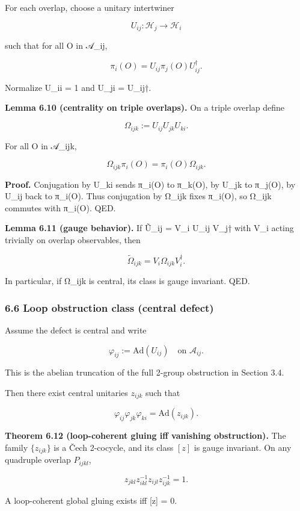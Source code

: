 \documentclass[
]{article}
\begin{document}
For each overlap, choose a unitary intertwiner

\[
U_{ij}: \mathcal H_j \to \mathcal H_i
\]

such that for all O in 𝒜\_ij,

\[
\pi_i(O) = U_{ij} \pi_j(O) U_{ij}^\dagger.
\]

Normalize U\_ii = 1 and U\_ji = U\_ij†.

\textbf{Lemma 6.10 (centrality on triple overlaps).} On a triple overlap
define

\[
\Omega_{ijk} := U_{ij} U_{jk} U_{ki}.
\]

For all O in 𝒜\_ijk,

\[
\Omega_{ijk} \pi_i(O) = \pi_i(O) \Omega_{ijk}.
\]

\textbf{Proof.} Conjugation by U\_ki sends π\_i(O) to π\_k(O), by U\_jk
to π\_j(O), by U\_ij back to π\_i(O). Thus conjugation by Ω\_ijk fixes
π\_i(O), so Ω\_ijk commutes with π\_i(O). QED.

\textbf{Lemma 6.11 (gauge behavior).} If Ũ\_ij = V\_i U\_ij V\_j† with
V\_i acting trivially on overlap observables, then

\[
\tilde{\Omega}_{ijk} = V_i \Omega_{ijk} V_i^\dagger.
\]

In particular, if Ω\_ijk is central, its class is gauge invariant. QED.

\subsubsection{6.6 Loop obstruction class (central
defect)}\label{loop-obstruction-class-central-defect-1}

Assume the defect is central and write

\[
\varphi_{ij} := \mathrm{Ad}(U_{ij}) \quad \text{on } \mathcal{A}_{ij}.
\]

This is the abelian truncation of the full 2-group obstruction in
Section 3.4.

Then there exist central unitaries \(z_{ijk}\) such that

\[
\varphi_{ij} \varphi_{jk} \varphi_{ki} = \mathrm{Ad}(z_{ijk}).
\]

\textbf{Theorem 6.12 (loop-coherent gluing iff vanishing obstruction).}
The family \(\{z_{ijk}\}\) is a Čech 2-cocycle, and its class \([z]\) is
gauge invariant. On any quadruple overlap \(P_{ijkl}\),

\[
z_{jkl} z_{ikl}^{-1} z_{ijl} z_{ijk}^{-1} = 1.
\]

A loop-coherent global gluing exists iff {[}z{]} = 0.
\end{document}

